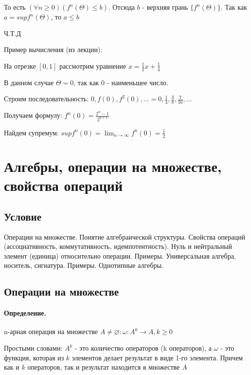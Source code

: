 \documentclass{report}
\begin{document}
То есть $(\forall n \geq 0)(f^{n}(\Theta) \leq b)$. Отсюда $b$ - верхняя грань $\{f^{n}(\Theta)\}$.
Так как $a = supf^{n}(\Theta)$, то $a \leq b$

\medskip

Ч.Т.Д

\medskip

Пример вычисления (из лекции):

На отрезке $[0,1]$ рассмотрим уравнение $x = \frac{1}{2}x + \frac{1}{4}$

В данном случае $\Theta = 0$, так как $0$ - наименьшее число.

Строим последовательность: $0, f(0), f^{2}(0), \ldots =
    0, \frac{1}{4}, \frac{3}{8}, \frac{7}{16}, \ldots$

\medskip

Получаем формулу: $f^{n}(0) = \frac{2^{n} - 1}{2^{n+1}}$

Найдем супремум: $supf^{n}(0) = \lim_{n \to \infty} f^{n}(0) = \frac{1}{2}$

\newpage

\section{Алгебры, операции на множестве, свойства операций}
\subsection{Условие}
Операции на множестве. Понятие алгебраической структуры. Свойства операций
(ассоциативность, коммутативность, идемпотентность). Нуль и нейтральный элемент
(единица) относительно операции. Примеры. Универсальная алгебра, носитель,
сигнатура. Примеры. Однотипные алгебры.

\subsection{Операции на множестве}

\paragraph*{Определение.} n-арная операция на множестве
$A \neq \varnothing: \omega: A^{k} \rightarrow A, k \geq 0$

Простыми словами: $A^{k}$ - это количество операторов (k операторов),
а $\omega$ - это функция, которая из $k$ элементов делает результат в виде 1-го элемента.
Причем как и $k$ операторов, так и результат находится в множестве $A$
\end{document}
